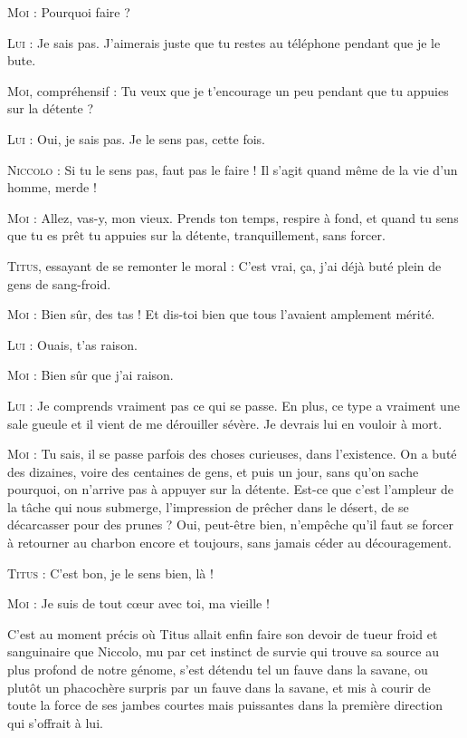 \textsc{Moi} : Pourquoi faire ?

\textsc{Lui} : Je sais pas. J’aimerais juste que tu restes au téléphone pendant que je le bute.

\textsc{Moi}, compréhensif : Tu veux que je t’encourage un peu pendant que tu appuies sur la détente ?

\textsc{Lui} : Oui, je sais pas. Je le sens pas, cette fois.

\textsc{Niccolo} : Si tu le sens pas, faut pas le faire ! Il s’agit quand même de la vie d’un homme, merde !

\textsc{Moi} : Allez, vas-y, mon vieux. Prends ton temps, respire à fond, et quand tu sens que tu es prêt tu appuies sur la détente, tranquillement, sans forcer.

\textsc{Titus}, essayant de se remonter le moral : C’est vrai, ça, j’ai déjà buté plein de gens de sang-froid.

\textsc{Moi} : Bien sûr, des tas ! Et dis-toi bien que tous l’avaient amplement mérité.

\textsc{Lui} : Ouais, t’as raison.

\textsc{Moi} : Bien sûr que j’ai raison.

\textsc{Lui} : Je comprends vraiment pas ce qui se passe. En plus, ce type a vraiment une sale gueule et il vient de me dérouiller sévère. Je devrais lui en vouloir à mort.

\textsc{Moi} : Tu sais, il se passe parfois des choses curieuses, dans l’existence. On a buté des dizaines, voire des centaines de gens, et puis un jour, sans qu’on sache pourquoi, on n’arrive pas à appuyer sur la détente. Est-ce que c’est l’ampleur de la tâche qui nous submerge, l’impression de prêcher dans le désert, de se décarcasser pour des prunes ? Oui, peut-être bien, n’empêche qu’il faut se forcer à retourner au charbon encore et toujours, sans jamais céder au découragement.

\textsc{Titus} : C’est bon, je le sens bien, là !

\textsc{Moi} : Je suis de tout cœur avec toi, ma vieille !

C’est au moment précis où Titus allait enfin faire son devoir de tueur froid et sanguinaire que Niccolo, mu par cet instinct de survie qui trouve sa source au plus profond de notre génome, s’est détendu tel un fauve dans la savane, ou plutôt un phacochère surpris par un fauve dans la savane, et mis à courir de toute la force de ses jambes courtes mais puissantes dans la première direction qui s’offrait à lui.

